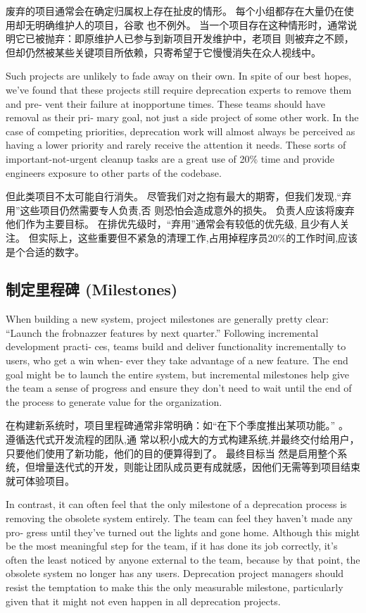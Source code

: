 \documentclass[10pt,a4paper,UTF8]{ctexart}
\begin{document}
废弃的项目通常会在确定归属权上存在扯皮的情形。 每个小组都存在大量仍在使用却无明确维护人的项目，谷歌
也不例外。 当一个项目存在这种情形时，通常说明它已被抛弃：即原维护人已参与到新项目开发维护中，老项目
则被弃之不顾，但却仍然被某些关键项目所依赖，只寄希望于它慢慢消失在众人视线中。

Such projects are unlikely to fade away on their own. In spite of our best hopes, we’ve found that
these projects still require deprecation experts to remove them and pre‐ vent their failure at
inopportune times. These teams should have removal as their pri‐ mary goal, not just a side project
of some other work. In the case of competing priorities, deprecation work will almost always be
perceived as having a lower priority and rarely receive the attention it needs. These sorts of
important-not-urgent cleanup tasks are a great use of 20\% time and provide engineers exposure to
other parts of the codebase.

但此类项目不太可能自行消失。 尽管我们对之抱有最大的期寄，但我们发现,“弃用”这些项目仍然需要专人负责,否
则恐怕会造成意外的损失。 负责人应该将废弃他们作为主要目标。 在排优先级时，“弃用”通常会有较低的优先级,
且少有人关注。 但实际上，这些重要但不紧急的清理工作,占用掉程序员20\%的工作时间,应该是个合适的数字。

\subsection{制定里程碑 (Milestones)}
\label{sec:org351823f}
When building a new system, project milestones are generally pretty clear: “Launch the frobnazzer
features by next quarter.” Following incremental development practi‐ ces, teams build and deliver
functionality incrementally to users, who get a win when‐ ever they take advantage of a new feature.
The end goal might be to launch the entire system, but incremental milestones help give the team a
sense of progress and ensure they don’t need to wait until the end of the process to generate value
for the organization.

在构建新系统时，项目里程碑通常非常明确：如“在下个季度推出某项功能。” 。 遵循迭代式开发流程的团队,通
常以积小成大的方式构建系统,并最终交付给用户，只要他们使用了新功能，他们的目的便算得到了。 最终目标当
然是启用整个系统，但增量迭代式的开发，则能让团队成员更有成就感，因他们无需等到项目结束就可体验项目。

In contrast, it can often feel that the only milestone of a deprecation process is removing the
obsolete system entirely. The team can feel they haven’t made any pro‐ gress until they’ve turned
out the lights and gone home. Although this might be the most meaningful step for the team, if it
has done its job correctly, it’s often the least noticed by anyone external to the team, because by
that point, the obsolete system no longer has any users. Deprecation project managers should resist
the temptation to make this the only measurable milestone, particularly given that it might not even
happen in all deprecation projects.
\end{document}
